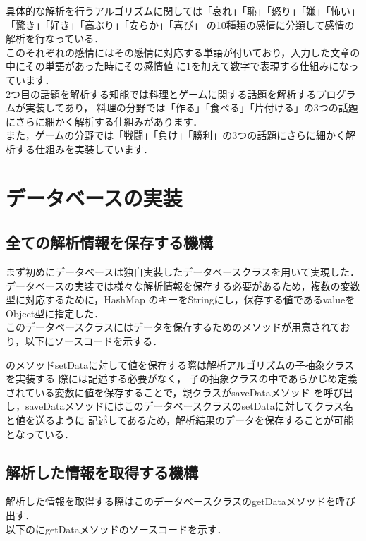 具体的な解析を行うアルゴリズムに関しては「哀れ」「恥」「怒り」「嫌」「怖い」「驚き」「好き」「高ぶり」「安らか」「喜び」
の10種類の感情に分類して感情の解析を行なっている．
\\

このそれぞれの感情にはその感情に対応する単語が付いており，入力した文章の中にその単語があった時にその感情値
に1を加えて数字で表現する仕組みになっています．
\\
2つ目の話題を解析する知能では料理とゲームに関する話題を解析するプログラムが実装してあり，
料理の分野では「作る」「食べる」「片付ける」の3つの話題にさらに細かく解析する仕組みがあります．
\\
また，ゲームの分野では「戦闘」「負け」「勝利」の3つの話題にさらに細かく解析する仕組みを実装しています．
\\


\section{データベースの実装}
\subsection{全ての解析情報を保存する機構}
まず初めにデータベースは独自実装したデータベースクラスを用いて実現した．
\\
データベースの実装では様々な解析情報を保存する必要があるため，複数の変数型に対応するために，HashMap
のキーをStringにし，保存する値であるvalueをObject型に指定した．
\\
このデータベースクラスにはデータを保存するためのメソッドが用意されており，以下にソースコードを示する．
\\

のメソッドsetDataに対して値を保存する際は解析アルゴリズムの子抽象クラスを実装する
際には記述する必要がなく，
子の抽象クラスの中であらかじめ定義されている変数に値を保存することで，親クラスがsaveDataメソッド
を呼び出し，saveDataメソッドにはこのデータベースクラスのsetDataに対してクラス名と値を送るように
記述してあるため，解析結果のデータを保存することが可能となっている．
\\
\subsection{解析した情報を取得する機構}
解析した情報を取得する際はこのデータベースクラスのgetDataメソッドを呼び出す．
\\
以下のにgetDataメソッドのソースコードを示す．

